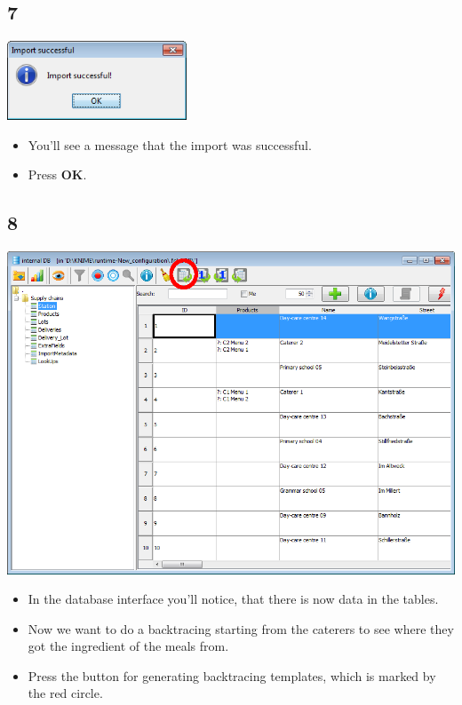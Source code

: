 \documentclass{beamer}
\begin{document}
\subsection{7}
\begin{frame}
	\begin{center}
  		\includegraphics[width=0.4\textwidth]{7.png}
	\end{center}
	\begin{itemize}
		\item You'll see a message that the import was successful.
		\item Press \textbf{OK}.
	\end{itemize}
\end{frame}

\subsection{8}
\begin{frame}
	\begin{center}
  		\includegraphics[height=0.5\textheight]{8.png}
	\end{center}
	\begin{itemize}
		\item In the database interface you'll notice, that there is now data in the tables.
		\item Now we want to do a backtracing starting from the caterers to see where they got the ingredient of the meals from.
		\item Press the button for generating backtracing templates, which is marked by the red circle.
	\end{itemize}
\end{frame}
\end{document}
